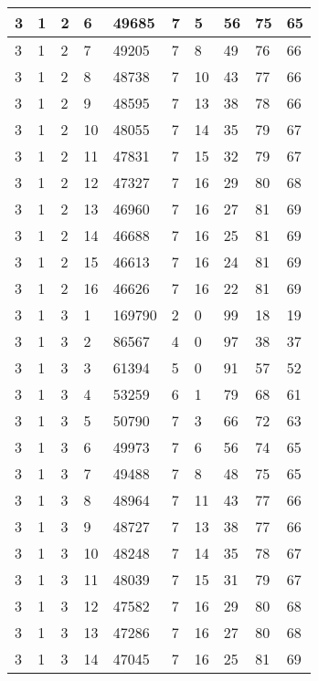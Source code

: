 \begin{table}[!ht]
\begin{tabular}{|l|l|l|l|l|l|l|l|l|l|}
        3 & 1 & 2 & 6 & 49685 & 7 & 5 & 56 & 75 & 65 \\ \hline
        3 & 1 & 2 & 7 & 49205 & 7 & 8 & 49 & 76 & 66 \\ \hline
        3 & 1 & 2 & 8 & 48738 & 7 & 10 & 43 & 77 & 66 \\ \hline
        3 & 1 & 2 & 9 & 48595 & 7 & 13 & 38 & 78 & 66 \\ \hline
        3 & 1 & 2 & 10 & 48055 & 7 & 14 & 35 & 79 & 67 \\ \hline
        3 & 1 & 2 & 11 & 47831 & 7 & 15 & 32 & 79 & 67 \\ \hline
        3 & 1 & 2 & 12 & 47327 & 7 & 16 & 29 & 80 & 68 \\ \hline
        3 & 1 & 2 & 13 & 46960 & 7 & 16 & 27 & 81 & 69 \\ \hline
        3 & 1 & 2 & 14 & 46688 & 7 & 16 & 25 & 81 & 69 \\ \hline
        3 & 1 & 2 & 15 & 46613 & 7 & 16 & 24 & 81 & 69 \\ \hline
        3 & 1 & 2 & 16 & 46626 & 7 & 16 & 22 & 81 & 69 \\ \hline
        3 & 1 & 3 & 1 & 169790 & 2 & 0 & 99 & 18 & 19 \\ \hline
        3 & 1 & 3 & 2 & 86567 & 4 & 0 & 97 & 38 & 37 \\ \hline
        3 & 1 & 3 & 3 & 61394 & 5 & 0 & 91 & 57 & 52 \\ \hline
        3 & 1 & 3 & 4 & 53259 & 6 & 1 & 79 & 68 & 61 \\ \hline
        3 & 1 & 3 & 5 & 50790 & 7 & 3 & 66 & 72 & 63 \\ \hline
        3 & 1 & 3 & 6 & 49973 & 7 & 6 & 56 & 74 & 65 \\ \hline
        3 & 1 & 3 & 7 & 49488 & 7 & 8 & 48 & 75 & 65 \\ \hline
        3 & 1 & 3 & 8 & 48964 & 7 & 11 & 43 & 77 & 66 \\ \hline
        3 & 1 & 3 & 9 & 48727 & 7 & 13 & 38 & 77 & 66 \\ \hline
        3 & 1 & 3 & 10 & 48248 & 7 & 14 & 35 & 78 & 67 \\ \hline
        3 & 1 & 3 & 11 & 48039 & 7 & 15 & 31 & 79 & 67 \\ \hline
        3 & 1 & 3 & 12 & 47582 & 7 & 16 & 29 & 80 & 68 \\ \hline
        3 & 1 & 3 & 13 & 47286 & 7 & 16 & 27 & 80 & 68 \\ \hline
        3 & 1 & 3 & 14 & 47045 & 7 & 16 & 25 & 81 & 69 \\ \hline

\end{tabular}
\end{table}
